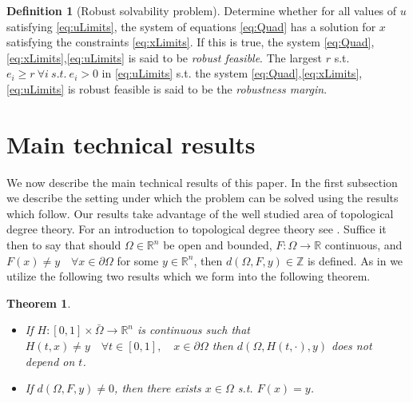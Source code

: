 \documentclass[11pt]{article}
\theoremstyle{plain}
\newtheorem{thm}{Theorem}[section]
\theoremstyle{definition}
\newtheorem{cdef}{Definition}[section]
\theoremstyle{remark}
\begin{document}
\begin{cdef}[Robust solvability problem]
\label{RobustDef}
Determine whether for all values of $u$ satisfying \eqref{eq:uLimits}, the system of equations \eqref{eq:Quad} has a solution for $x$ satisfying the constraints \eqref{eq:xLimits}. If this is true, the system \eqref{eq:Quad},\eqref{eq:xLimits},\eqref{eq:uLimits} is said to be \emph{robust feasible}. The largest $r$ s.t. $e_i\geq r \ \forall i \ s.t. \ e_i>0$ in \eqref{eq:uLimits} s.t. the system \eqref{eq:Quad},\eqref{eq:xLimits},\eqref{eq:uLimits} is robust feasible is said to be the \emph{robustness margin}.
\end{cdef}

\section{Main technical results}
We now describe the main technical results of this paper. In the first subsection we describe the setting under which the problem can be solved using the results which follow. Our results take advantage of the well studied area of topological degree theory. For an introduction to topological degree theory see {\color{blue}{NEED REFS}}. Suffice it then to say that should $\Omega\in\mathbb{R}^{n}$ be open and bounded, $F:\Omega\rightarrow \mathbb{R}$ continuous, and $F(x)\neq y \quad \forall x\in\partial\Omega$ for some $y\in\mathbb{R}^n$, then $d\left(\Omega,F,y\right)\in\mathbb{Z}$ is defined. 
As in {\color{blue}{Frommer, Hoxha and Lang Thm1}} we utilize the following two results which we form into the following theorem.
\begin{thm} \ \\
\label{thm:Deg}
\begin{itemize}
\item[(i)] If $H : [0,1]\times\bar{\Omega}\rightarrow\mathbb{R}^n$ is continuous such that $H(t,x)\neq y \quad \forall t\in[0,1], \quad x\in\partial\Omega$ then $d\left(\Omega,H(t,\cdot),y\right)$ does not depend on $t$.
\item[(ii)] If $d(\Omega,F,y)\neq 0$, then there exists $x\in\Omega$ s.t. $F(x)=y$.
\end{itemize}

\end{thm}
\end{document}
